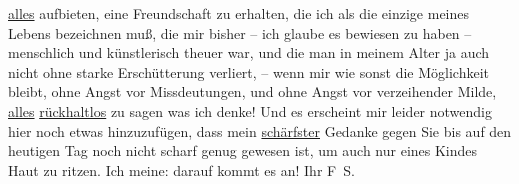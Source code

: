 \begin{ledgroupsized}[t]{13cm}
                  \uline{alles} aufbieten, eine Freundschaft zu erhalten,
               die ich als die einzige meines Lebens bezeichnen muß, die mir bisher – ich glaube es
               bewiesen zu haben – menschlich und künstlerisch theuer war, und die man in meinem
               Alter ja auch nicht ohne starke Erschütterung verliert, – wenn mir wie sonst die
               Möglichkeit bleibt, ohne Angst vor Missdeutungen, und ohne Angst vor verzeihender
               Milde, \uline{alles}{ }\uline{rückhaltlos} zu sagen was ich denke! Und es erscheint
               mir leider notwendig hier noch etwas hinzuzufügen, dass mein \uline{schärfster} Gedanke \introOben{}gegen Sie\introOben{} bis auf den
               heutigen Tag noch nicht scharf genug gewesen ist, um auch nur eines Kindes Haut zu
               ritzen. Ich meine: darauf kommt es an!\pend
           \pstart Ihr \spacefill\mbox{F S.}\pend{}
         
         \endnumbering{}\end{ledgroupsized}  \newcommand{\dateiname}{L03355}\newcommand{\titel}{Felix Salten an Arthur Schnitzler, [11. 11. 1903]}\newcommand{\editorInnen}{Martin Anton Müller und Laura Untner}
      